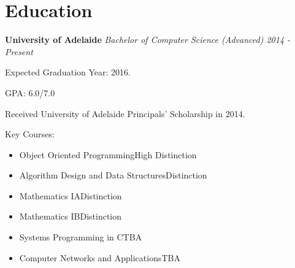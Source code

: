 \documentclass[10pt,oneside,a4paper]{article}
\newcommand{\info}[2] 
{
    {
        \section*{#1}
        \hrulefill\newline
    }

    {#2}
}
\begin{document}
\info{Education}
{
    \textbf{University of Adelaide}\newline
    \emph{Bachelor of Computer Science (Advanced) \hfill 2014 - Present}
    \begin{description}[leftmargin=0.5cm, itemindent=0cm]
        \item Expected Graduation Year: 2016.
        \item GPA: 6.0/7.0
        \item Received University of Adelaide Principals' Scholarship in 2014.
        \item Key Courses:
            \begin{itemize}
                \item Object Oriented Programming\dotfill High Distinction
                \item Algorithm Design and Data Structures\dotfill Distinction
                \item Mathematics IA\dotfill Distinction
                \item Mathematics IB\dotfill Distinction
                \item Systems Programming in C\dotfill TBA
                \item Computer Networks and Applications\dotfill TBA
            \end{itemize}
    \end{description}
}
\end{document}
